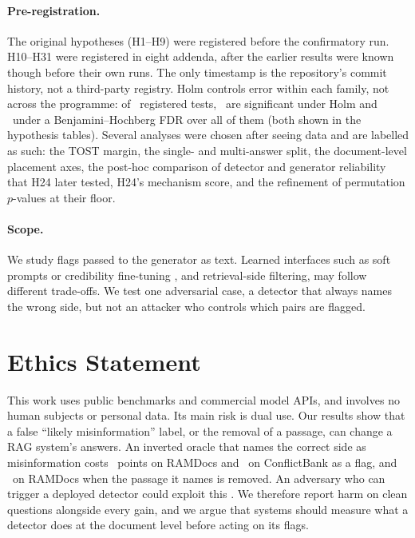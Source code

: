 \paragraph{Pre-registration.} The original hypotheses (H1--H9) were registered before the confirmatory run. H10--H31
were registered in eight addenda, after the earlier results were known though before their own runs. The only
timestamp is the repository's commit history, not a third-party registry. Holm controls error within each family, not
across the programme: of \fdrN\ registered tests, \fdrHolm\ are significant under Holm and \fdrBH\ under a
Benjamini--Hochberg FDR over all of them (both shown in the hypothesis tables). Several analyses were chosen after
seeing data and are labelled as such: the TOST margin, the single- and multi-answer split, the document-level
placement axes, the post-hoc comparison of detector and generator reliability that H24 later tested, H24's mechanism
score, and the refinement of permutation $p$-values at their floor.

\paragraph{Scope.} We study flags passed to the generator as text. Learned interfaces such as soft prompts or
credibility fine-tuning \citep{ye2026tcr,pan2024credibility}, and retrieval-side filtering, may follow different
trade-offs. We test one adversarial case, a detector that always names the wrong side, but not an attacker who controls
which pairs are flagged.

\section*{Ethics Statement}
This work uses public benchmarks and commercial model APIs, and involves no human subjects or personal data. Its main
risk is dual use. Our results show that a false ``likely misinformation'' label, or the removal of a passage, can
change a RAG system's answers. An inverted oracle that names the correct side as misinformation costs \aadvDirConf\
points on RAMDocs and \azCbMiniOracleInvFlagDirectionalConflict\ on ConflictBank as a flag, and \aadvRemConf\ on
RAMDocs when the passage it names is removed. An adversary who can trigger a deployed detector could exploit this
\citep{zou2025poisonedrag}. We therefore report harm on clean questions alongside every gain, and we argue that
systems should measure what a detector does at the document level before acting on its flags.
